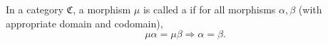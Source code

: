 In a category $\mathfrak{C}$, a morphism $\mu$ is called a  if for all morphisms $\alpha, \beta$ (with appropriate domain and codomain),
$$\mu \alpha = \mu \beta \Rightarrow \alpha = \beta.$$
